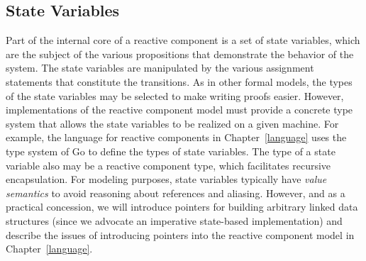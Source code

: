 \subsection{State Variables}
Part of the internal core of a reactive component is a set of state variables, which are the subject of the various propositions that demonstrate the behavior of the system.
The state variables are manipulated by the various assignment statements that constitute the transitions.
As in other formal models, the types of the state variables may be selected to make writing proofs easier.
However, implementations of the reactive component model must provide a concrete type system that allows the state variables to be realized on a given machine.
For example, the language for reactive components in Chapter~\ref{language} uses the type system of Go to define the types of state variables.
The type of a state variable also may be a reactive component type, which facilitates recursive encapsulation.
For modeling purposes, state variables typically have \emph{value semantics} to avoid reasoning about references and aliasing.
However, and as a practical concession, we will introduce pointers for building arbitrary linked data structures (since we advocate an imperative state-based implementation) and describe the issues of introducing pointers into the reactive component model in Chapter~\ref{language}.


